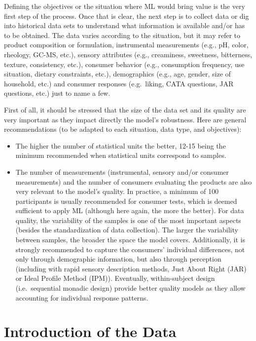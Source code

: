 \documentclass[
]{krantz}
\providecommand{\tightlist}{%
  \setlength{\itemsep}{0pt}\setlength{\parskip}{0pt}}
\begin{document}
Defining the objectives or the situation where ML would bring value is the very first step of the process. Once that is clear, the next step is to collect data or dig into historical data sets to understand what information is available and/or has to be obtained. The data varies according to the situation, but it may refer to product composition or formulation, instrumental measurements (e.g., pH, color, rheology, GC-MS, etc.), sensory attributes (e.g., creaminess, sweetness, bitterness, texture, consistency, etc.), consumer behavior (e.g., consumption frequency, use situation, dietary constraints, etc.), demographics (e.g., age, gender, size of household, etc.) and consumer responses (e.g.~liking, CATA questions, JAR questions, etc.) just to name a few.

First of all, it should be stressed that the size of the data set and its quality are very important as they impact directly the model's robustness. Here are general recommendations (to be adapted to each situation, data type, and objectives):

\begin{itemize}
\tightlist
\item
  The higher the number of statistical units the better, 12-15 being the minimum recommended when statistical units correspond to samples.
\item
  The number of measurements (instrumental, sensory and/or consumer measurements) and the number of consumers evaluating the products are also very relevant to the model's quality. In practice, a minimum of 100 participants is usually recommended for consumer tests, which is deemed sufficient to apply ML (although here again, the more the better).
  For data quality, the variability of the samples is one of the most important aspects (besides the standardization of data collection). The larger the variability between samples, the broader the space the model covers. Additionally, it is strongly recommended to capture the consumers' individual differences, not only through demographic information, but also through perception (including with rapid sensory description methods, Just About Right (JAR) or Ideal Profile Method (IPM)). Eventually, within-subject design (i.e.~sequential monadic design) provide better quality models as they allow accounting for individual response patterns.
\end{itemize}

\hypertarget{introduction-of-the-data}{%
\section{Introduction of the Data}\label{introduction-of-the-data}}
\end{document}
